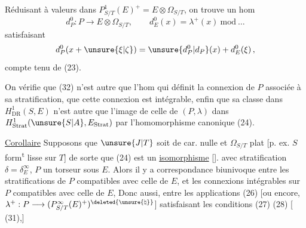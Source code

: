 Réduisant à valeurs dans $P^1_{S/T}(E)^+=E\otimes\Omega_{S/T}$, on trouve un hom
\[
 d^0_P:P\longrightarrow E\otimes\Omega_{S/T},\qquad d^0_E(x)=\lambda^+(x)\ \mathrm{mod}\ \ldots \tag*{(32)}
\]
satisfaisant
\[
 d^0_P(x+\unsure{\xi|\zeta})=\unsure{d^0_P|d_P}(x)+d^0_E(\xi)\,,
\]
compte tenu de (23).

On vérifie que (32) n'est autre que l'hom qui définit la connexion de $P$ associée à sa stratification,  que cette connexion est intégrable, enfin que sa classe dans $H^1_{\mathrm{DR}}(S,E)$ n'est autre que l'image de celle de  $(P,\lambda)$ dans $H^1_{\mathrm{Strat}}(\unsure{S|A},E_{\mathrm{Strat}})$ par l'homomorphisme canonique (24).

\uline{Corollaire} Supposons que $\unsure{J|T}$ soit de car. nulle et $\Omega_{S/T}$ plat [p. ex. $S$ form\textsuperscript{t} lisse sur $T$] de sorte que (24) est un \uline{isomorphisme} [\enspace].     avec stratification $\delta=\delta^\infty_E$, $P$ un torseur sous $E$. Alors il y a correspondance biunivoque entre les stratifications de $P$ compatibles avec celle de $E$, et les connexions intégrables sur $P$ compatibles avec celle de $E$,
Donc aussi, entre les applications (26)   [ou encore, $\lambda^+:P\longrightarrow (P^\infty_{S/T}(E)^+)^{\deleted{\unsure{\natural}}}$] satisfaisant les conditions (27) (28) [ (31),]  
